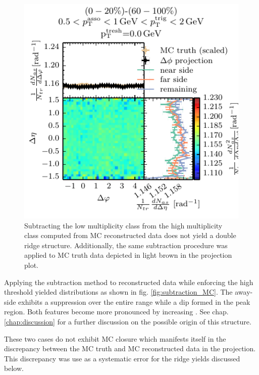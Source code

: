 \begin{figure}
  \centering
  \includegraphics[]{figures/05_12_sub_mc_thresh_00.pdf}
  \caption[Subtracting the low multiplicity class from the high multiplicity class computed from MC reconstructed data.]{Subtracting the low multiplicity class from the high multiplicity class computed from MC reconstructed data does not yield a double ridge structure. Additionally, the same subtraction procedure was applied to MC truth data depicted in light brown in the \dphi projection plot. }
  \label{fig:subtraction_MC_no_thresh}
\end{figure}

Applying the subtraction method to reconstructed data while enforcing the high \pt threshold yielded distributions as shown in fig. \ref{fig:subtraction_MC}. The \gls{away-side} exhibits a suppression over the entire \deta range while a dip formed in the peak region. Both features become more pronounced by increasing  \ptthresh. See chap. \ref{chap:discussion} for a further discussion on the possible origin of this structure.

These two cases do not exhibit MC closure which manifests itself in the discrepancy between the MC truth and MC reconstructed data in the \dphi projection. This discrepancy was use as a systematic error for the ridge yields discussed below.

